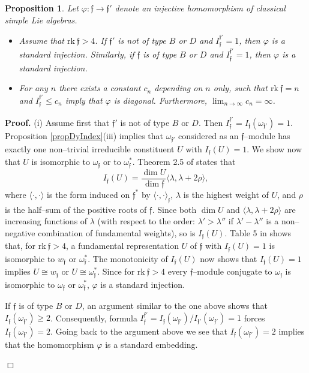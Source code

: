 \documentclass[oneside,leqno,12pt]{article}
\newcounter{theorem}
\newtheorem{prop}[theo]{Proposition}
\newenvironment{proof}{ \noindent \textbf{Proof.}}{\hfill $\Box$}
\def\gf{\mathfrak{f}}
\newcommand {\rk} {\mathrm{rk~}}
\renewcommand {\phi} {\varphi}
\begin{document}
\begin{prop}\label{prop3.3}
Let $\phi:\gf\to\gf'$ denote an injective homomorphism of classical simple Lie algebras. 
\begin{itemize}
\item[\rm{(i)}] Assume that $\rk \gf >4$. If $\gf'$ is not of type $B$ or $D$ and $I_\gf^{\gf'}=1$, then $\phi$ is a standard injection. Similarly,
 if $\gf$ is of type $B$ or $D$ and $I_\gf^{\gf'}=1$, then $\phi$ is a standard injection. 
\item[\rm{(ii)}] For any $n$ there exists a constant $c_n$ depending on $n$ only, such that $\rk \gf =n$ and $I_\gf^{\gf'}\leq c_n$ imply that $\phi$ is diagonal. 
Furthermore, $\lim_{n\to\infty}c_n=\infty$. 
\end{itemize}
\end{prop}
\begin{proof} 
(i) Assume first that $\gf'$ is not of type $B$ or $D$. Then $I_\gf^{\gf'} = I_\gf(\omega_{\gf'}) =1$. Proposition  \ref{propDyIndex}(iii) implies that
$\omega_{\gf'}$ considered as an $\gf$--module has exactly one non--trivial irreducible constituent $U$ with $I_\gf(U) =1$. 
We show now that $U$ is isomorphic to $\omega_\gf$ or to $\omega_\gf^*$.
Theorem 2.5 of \cite{Dy2} states that
\begin{equation} \label{equation3}
I_\gf(U) = \frac{\dim U}{\dim \gf} \langle \lambda, \lambda + 2 \rho \rangle,
\end{equation}
where 
$\langle \cdot, \cdot \rangle$ is the form induced on $\gf^*$ by $\langle \cdot, \cdot \rangle_\gf$, 
$\lambda$ is the highest weight of $U$, and $\rho$ is the half--sum of the positive roots of $\gf$. Since both $\dim U$ and 
$\langle \lambda, \lambda + 2 \rho \rangle$ are increasing functions of $\lambda$ (with respect to 
the order: $\lambda' > \lambda ''$ if $\lambda' - \lambda''$
is a non--negative combination of fundamental weights), so is $I_\gf(U)$. Table 5 in \cite{Dy2} shows that, for $\rk \gf > 4$,  a fundamental representation $U$ of $\gf$
 with $I_\gf(U) = 1$ is isomorphic to  $w_\gf$ or $\omega_\gf^*$. The monotonicity of $I_\gf(U)$ now shows that
$I_\gf(U) = 1$ implies $U \cong w_\gf$ or $U \cong \omega_\gf^*$.  Since for $\rk \gf >4$ every $\gf$--module conjugate
to $\omega_\gf$ is isomorphic to $\omega_\gf$ or $\omega_\gf^*$, $\phi$ is a standard injection.

If $\gf$ is of type $B$ or $D$, an argument similar to the one above shows that $I_\gf(\omega_{\gf'}) \geq 2$.
Consequently, formula $I_\gf^{\gf'} =  I_\gf(\omega_{\gf'}) / I_{\gf'}(\omega_{\gf'}) =1$ forces $I_\gf(\omega_{\gf'}) =2$.
Going back to the argument above we see that $I_\gf(\omega_{\gf'}) = 2$ implies that
the homomorphism $\phi$ is a standard embedding. 


\end{proof}
\end{document}
